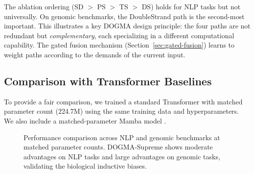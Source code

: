 \begin{keyinsight}
The ablation ordering (SD $>$ PS $>$ TS $>$ DS) holds for NLP tasks but not universally. On genomic benchmarks, the DoubleStrand path is the second-most important. This illustrates a key DOGMA design principle: the four paths are not redundant but \emph{complementary}, each specializing in a different computational capability. The gated fusion mechanism (Section~\ref{sec:gated-fusion}) learns to weight paths according to the demands of the current input.
\end{keyinsight}

\subsection{Comparison with Transformer Baselines}

To provide a fair comparison, we trained a standard Transformer \citep{vaswani2017attention} with matched parameter count (224.7M) using the same training data and hyperparameters. We also include a matched-parameter Mamba model \citep{gu2023mamba}.

\begin{figure}[H]
\centering
{}
\caption{Performance comparison across NLP and genomic benchmarks at matched parameter counts. DOGMA-Supreme shows moderate advantages on NLP tasks and large advantages on genomic tasks, validating the biological inductive biases.}
\label{fig:benchmark-comparison}
\end{figure}


